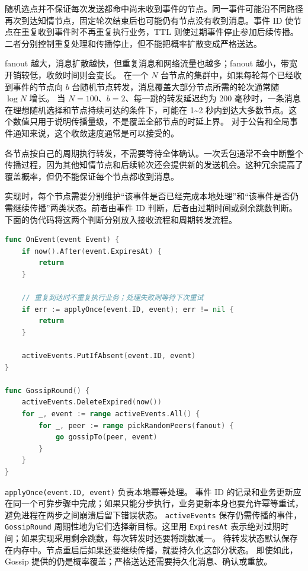 随机选点并不保证每次发送都命中尚未收到事件的节点。同一事件可能沿不同路径再次到达知情节点，固定轮次结束后也可能仍有节点没有收到消息。事件 ID 使节点在重复收到事件时不再重复执行业务，TTL 则使过期事件停止参加后续传播。二者分别控制重复处理和传播停止，但不能把概率扩散变成严格送达。

fanout 越大，消息扩散越快，但重复消息和网络流量也越多；fanout 越小，带宽开销较低，收敛时间则会变长。
在一个 $N$ 台节点的集群中，如果每轮每个已经收到事件的节点向 $b$ 台随机节点转发，消息覆盖大部分节点所需的轮次通常随 $\log N$ 增长。
当 $N = 100$、$b = 2$、每一跳的转发延迟约为 200 毫秒时，一条消息在理想随机选择和节点持续可达的条件下，可能在 1\textasciitilde2 秒内到达大多数节点。这个数值只用于说明传播量级，不是覆盖全部节点的时延上界。
对于公告和全局事件通知来说，这个收敛速度通常是可以接受的。

各节点按自己的周期执行转发，不需要等待全体确认。一次丢包通常不会中断整个传播过程，因为其他知情节点和后续轮次还会提供新的发送机会。这种冗余提高了覆盖概率，但仍不能保证每个节点都收到消息。

实现时，每个节点需要分别维护“该事件是否已经完成本地处理”和“该事件是否仍需继续传播”两类状态。前者由事件 ID 判断，后者由过期时间或剩余跳数判断。下面的伪代码将这两个判断分别放入接收流程和周期转发流程。

\begin{tcolorbox}[title=Gossip 的转发判断]
\begin{lstlisting}[style=codeblock, language=go]
func OnEvent(event Event) {
    if now().After(event.ExpiresAt) {
        return
    }

    // 重复到达时不重复执行业务；处理失败则等待下次重试
    if err := applyOnce(event.ID, event); err != nil {
        return
    }

    activeEvents.PutIfAbsent(event.ID, event)
}

func GossipRound() {
    activeEvents.DeleteExpired(now())
    for _, event := range activeEvents.All() {
        for _, peer := range pickRandomPeers(fanout) {
            go gossipTo(peer, event)
        }
    }
}
\end{lstlisting}
\end{tcolorbox}

\texttt{applyOnce(event.ID, event)} 负责本地幂等处理。
事件 ID 的记录和业务更新应在同一个可靠步骤中完成；如果只能分步执行，业务更新本身也要允许幂等重试，避免进程在两步之间崩溃后留下错误状态。
\texttt{activeEvents} 保存仍需传播的事件，\texttt{GossipRound} 周期性地为它们选择新目标。这里用 \texttt{ExpiresAt} 表示绝对过期时间；如果实现采用剩余跳数，每次转发时还要将跳数减一。
待转发状态默认保存在内存中。节点重启后如果还要继续传播，就要持久化这部分状态。
即使如此，Gossip 提供的仍是概率覆盖；严格送达还需要持久化消息、确认或重放。

